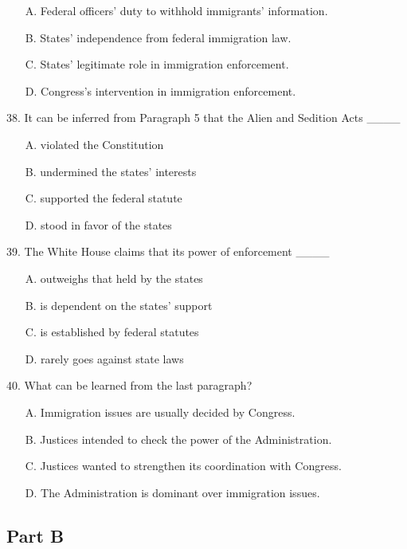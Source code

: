 \documentclass[UTF8,11pt]{ctexart}
\begin{document}
\begin{itemize}[leftmargin=2em,itemsep=.2em,topsep=.4em]\item[A.] Federal officers’ duty to withhold immigrants’ information.
\item[B.] States’ independence from federal immigration law.
\item[C.] States’ legitimate role in immigration enforcement.
\item[D.] Congress’s intervention in immigration enforcement.
\end{itemize}

38. It can be inferred from Paragraph 5 that the Alien and Sedition Acts \_\_\_\_


\begin{itemize}[leftmargin=2em,itemsep=.2em,topsep=.4em]\item[A.] violated the Constitution
\item[B.] undermined the states’ interests
\item[C.] supported the federal statute
\item[D.] stood in favor of the states
\end{itemize}

39. The White House claims that its power of enforcement \_\_\_\_


\begin{itemize}[leftmargin=2em,itemsep=.2em,topsep=.4em]\item[A.] outweighs that held by the states
\item[B.] is dependent on the states’ support
\item[C.] is established by federal statutes
\item[D.] rarely goes against state laws
\end{itemize}

40. What can be learned from the last paragraph?


\begin{itemize}[leftmargin=2em,itemsep=.2em,topsep=.4em]\item[A.] Immigration issues are usually decided by Congress.
\item[B.] Justices intended to check the power of the Administration.
\item[C.] Justices wanted to strengthen its coordination with Congress.
\item[D.] The Administration is dominant over immigration issues.
\end{itemize}

\subsection*{\textbf{Part B}}
\end{document}
